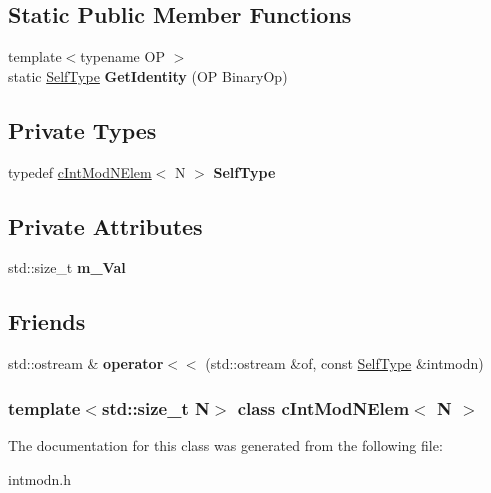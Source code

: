 \subsection*{\-Static \-Public \-Member \-Functions}
\begin{DoxyCompactItemize}
\item 
\hypertarget{classcIntModNElem_a5130425382c5a5bdfd28f3b7742a4878}{
{\footnotesize template$<$typename O\-P $>$ }\\static \hyperlink{classcIntModNElem}{\-Self\-Type} {\bfseries \-Get\-Identity} (\-O\-P \-Binary\-Op)}
\label{classcIntModNElem_a5130425382c5a5bdfd28f3b7742a4878}

\end{DoxyCompactItemize}
\subsection*{\-Private \-Types}
\begin{DoxyCompactItemize}
\item 
\hypertarget{classcIntModNElem_ae78e9df5cc365eb679d0007191f86424}{
typedef \hyperlink{classcIntModNElem}{c\-Int\-Mod\-N\-Elem}$<$ \-N $>$ {\bfseries \-Self\-Type}}
\label{classcIntModNElem_ae78e9df5cc365eb679d0007191f86424}

\end{DoxyCompactItemize}
\subsection*{\-Private \-Attributes}
\begin{DoxyCompactItemize}
\item 
\hypertarget{classcIntModNElem_abaf8f2803c5a508b807c7e142da41b51}{
std\-::size\-\_\-t {\bfseries m\-\_\-\-Val}}
\label{classcIntModNElem_abaf8f2803c5a508b807c7e142da41b51}

\end{DoxyCompactItemize}
\subsection*{\-Friends}
\begin{DoxyCompactItemize}
\item 
\hypertarget{classcIntModNElem_ac999b0fda4f712c41d0a8f38c4584a8d}{
std\-::ostream \& {\bfseries operator$<$$<$} (std\-::ostream \&of, const \hyperlink{classcIntModNElem}{\-Self\-Type} \&intmodn)}
\label{classcIntModNElem_ac999b0fda4f712c41d0a8f38c4584a8d}

\end{DoxyCompactItemize}
\subsubsection*{template$<$std\-::size\-\_\-t \-N$>$ class c\-Int\-Mod\-N\-Elem$<$ N $>$}



\-The documentation for this class was generated from the following file\-:\begin{DoxyCompactItemize}
\item 
intmodn.\-h\end{DoxyCompactItemize}
